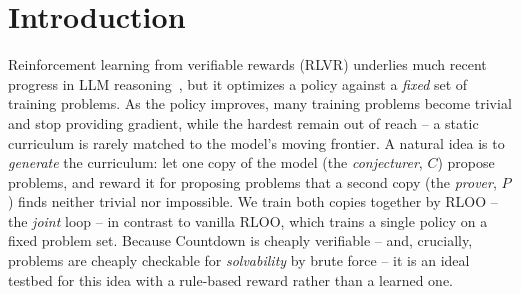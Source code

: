 \documentclass{article}
\begin{document}
\begin{abstract}
We study whether a 0.5B language model can train itself by generating its own
problems, via a joint conjecturer/prover loop on Countdown arithmetic with a
rule-based verifier. After implementing SFT, IPO, and RLOO from scratch, we build
a nine-phase joint trainer with a shaped difficulty-band reward, a brute-force
solvability filter, and distributional anchoring. Across four configurations we
find that all RL methods significantly improve pass@1 over SFT but none
significantly change pass@16 (n${=}50$). More importantly, we map two opposite
failure modes of two-policy self-play -- collapse to too-easy problems under an
aggressive conjecturer update (high learning rate, weak KL anchor), and collapse
to too-hard problems plus a silent gradient-accumulation starvation under a
conservative one (low learning rate, strong KL anchor) -- and show that the
conjecturer received a reward signal on only
$\sim$29\% of steps. We diagnose the starvation bug and fix it; the corrected run restores the curriculum but still does not beat plain RLOO downstream. Our contribution is a rigorously documented negative result: a set of
necessary conditions, and the accompanying instrumentation, for stable curriculum self-play.
\end{abstract}

\section{Introduction}
Reinforcement learning from verifiable rewards (RLVR) underlies much recent
progress in LLM reasoning~\cite{deepseekr1,gandhi2024sos}, but it optimizes a
policy against a \emph{fixed} set of training problems. As the policy improves,
many training problems become trivial and stop providing gradient, while the
hardest remain out of reach -- a static curriculum is rarely matched to the
model's moving frontier. A natural idea is to \emph{generate} the curriculum:
let one copy of the model (the \emph{conjecturer}, $C$) propose problems, and
reward it for proposing problems that a second copy (the \emph{prover}, $P$)
finds neither trivial nor impossible. We train both copies together by RLOO --
the \emph{joint} loop -- in contrast to vanilla RLOO, which trains a single policy
on a fixed problem set. Because Countdown is cheaply
verifiable -- and, crucially, problems are cheaply checkable for
\emph{solvability} by brute force -- it is an ideal testbed for this idea with a
rule-based reward rather than a learned one.
\end{document}

